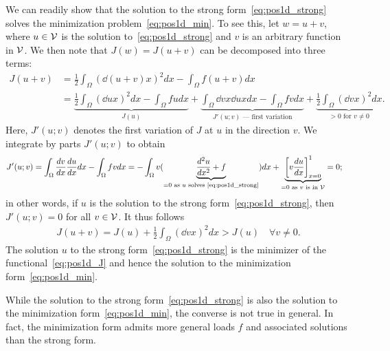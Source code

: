 We can readily show that the solution to the strong form~\eqref{eq:pos1d_strong} solves the minimization problem~\eqref{eq:pos1d_min}.  To see this, let $w = u + v$, where $u \in \mathcal{V}$ is the solution to~\eqref{eq:pos1d_strong} and $v$ is an arbitrary function in $\mathcal{V}$.  We then note that $J(w) = J(u+v)$ can be decomposed into three terms:
\begin{align*}
  J(u+v) &= \frac{1}{2} \int_{\Omega} \left( \dd{(u+v)}{x} \right)^2 dx - \int_\Omega f(u+v) dx \\
  &= \underbrace{ \frac{1}{2} \int_{\Omega} \left( \dd{u}{x} \right)^2 dx - \int_\Omega f u dx }_{J(u)}
  + \underbrace{ \int_{\Omega} \dd{v}{x} \dd{u}{x} dx - \int_\Omega f v dx }_{J'(u;v) \text{ --- first variation}}
  + \underbrace{ \frac{1}{2} \int_{\Omega} \left( \dd{v}{x} \right)^2 dx }_{> 0 \text{ for } v \neq 0}.
\end{align*}
Here, $J'(u;v)$ denotes the first variation of $J$ at $u$ in the direction $v$.  We integrate by parts $J'(u;v)$ to obtain
\begin{align*}
  J'(u;v) &= \int_{\Omega} \frac{d v}{d x} \frac{d u}{d x} dx - \int_\Omega f v dx
  =
  - \int_{\Omega} v ( \underbrace{ \frac{d ^2u}{d x^2} + f}_{= 0 \text{ as $u$ solves \eqref{eq:pos1d_strong}}} ) dx + \underbrace{ \left[ v \frac{d u}{d x} \right]_{x=0}^1 }_{= 0 \text{ as $v$ is in $\mathcal{V}$}}
  = 0;
\end{align*}
in other words, if $u$ is the solution to the strong form~\eqref{eq:pos1d_strong}, then $J'(u;v) = 0$ for all $v \in \mathcal{V}$. It thus follows
\begin{align*}
  J(u + v) = J(u) + \frac{1}{2} \int_\Omega \left( \dd{v}{x} \right)^2 dx
  > J(u)  \quad \forall v \neq 0.
\end{align*}
The solution $u$ to the strong form~\eqref{eq:pos1d_strong} is the minimizer of the functional~\eqref{eq:pos1d_J} and hence the solution to the minimization form~\eqref{eq:pos1d_min}.

While the solution to the strong form~\eqref{eq:pos1d_strong} is also the solution to the minimization form~\eqref{eq:pos1d_min}, the converse is not true in general.  In fact, the minimization form admits more general loads $f$ and associated solutions than the strong form.

